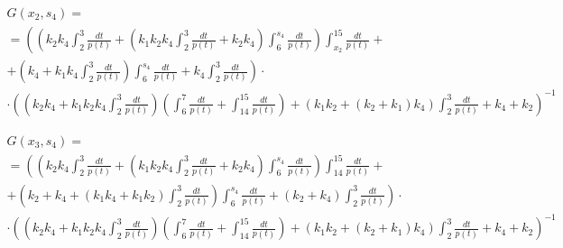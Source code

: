 \documentclass[a4paper,12pt]{article} %
\begin{document}
\begin{multline}
	G(x_2,s_4)=\\=
	\left(
		\left( k_2 k_4 \int_{2}^{3}\frac{dt}{p(t)}+
		\left( k_1 k_2 k_4 \int_{2}^{3}\frac{dt}{p(t)}+
		k_2 k_4\right)  \int_{6}^{s_4}\frac{dt}{p(t)}\right)  \int_{x_2}^{15}\frac{dt}{p(t)}
		\right. + \\ + \left.
		\left( k_4+k_1 k_4 \int_{2}^{3}\frac{dt}{p(t)}\right)  \int_{6}^{s_4}\frac{dt}{p(t)}+k_4 \int_{2}^{3}\frac{dt}{p(t)}
	\right) \cdot \\ \cdot \left(
		\left( k_2 k_4+k_1 k_2 k_4 \int_{2}^{3}\frac{dt}{p(t)}\right)
		\left( \int_{6}^{7}\frac{dt}{p(t)}+ \int_{14}^{15}\frac{dt}{p(t)} \right)+
		\left( k_1 k_2+\left( k_2+k_1\right)  k_4\right)  \int_{2}^{3}\frac{dt}{p(t)}+k_4+k_2
	\right)^{-1}
\end{multline}

\begin{multline}
	G(x_3,s_4)=\\=
	\left(
		\left( k_2 k_4 \int_{2}^{3}\frac{dt}{p(t)}+
		\left( k_1 k_2 k_4 \int_{2}^{3}\frac{dt}{p(t)}+
		k_2 k_4\right)  \int_{6}^{s_4}\frac{dt}{p(t)}\right)  \int_{14}^{15}\frac{dt}{p(t)}
		\right. + \\ + \left.
		\left( k_2+k_4+\left( k_1 k_4+k_1 k_2\right)  \int_{2}^{3}\frac{dt}{p(t)}\right)  \int_{6}^{s_4}\frac{dt}{p(t)}+\left( k_2+k_4\right)  \int_{2}^{3}\frac{dt}{p(t)}
	\right) \cdot \\ \cdot \left(
		\left( k_2 k_4+k_1 k_2 k_4 \int_{2}^{3}\frac{dt}{p(t)}\right)
		\left( \int_{6}^{7}\frac{dt}{p(t)}+ \int_{14}^{15}\frac{dt}{p(t)} \right)+
		\left( k_1 k_2+\left( k_2+k_1\right)  k_4\right)  \int_{2}^{3}\frac{dt}{p(t)}+k_4+k_2
	\right)^{-1}
\end{multline}
\end{document}
